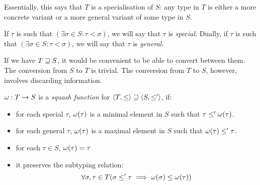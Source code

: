 \documentclass[main.tex]{subfiles}
\begin{document}
Essentially, this says that $T$ is a specialisation of $S$: any type in
$T$ is either a more concrete variant or a more general variant of some type in $S$.

If $\tau$ is such that $(\exists \sigma \in S : \tau \less \sigma)$, we will
say that $\tau$ is \emph{special}. Dually, if $\tau$ is such that
$(\exists \sigma \in S : \tau \less \sigma)$, we will say that $\tau$ is
\emph{general}.

If we have $T \sqsupseteq S$, it would be convenient to be able to convert between them.
The conversion from $S$ to $T$ is trivial. The conversion from $T$ to $S$,
however, involves discarding information.


\begin{defn}
    $\omega: T \rightarrow S$ is a \emph{squash function} for
    $\langle T, \leq \rangle \sqsupseteq \langle S, \leq' \rangle$, if:
    \begin{itemize}
        \item for each special $\tau$, $\omega(\tau)$ is a minimal element in $S$ such that
            $\tau \leq' \omega(\tau)$.
        \item for each general $\tau$, $\omega(\tau)$ is a maximal element in $S$ such that
            $\omega(\tau) \leq' \tau$.
        \item for each $\tau \in S$, $\omega(\tau) = \tau$
        \item it preserves the subtyping relation:
            \[ \forall \sigma, \tau \in T (\sigma \leq' \tau \implies
                \omega(\sigma) \leq \omega(\tau)) \]
    \end{itemize}
\end{defn}
\end{document}
